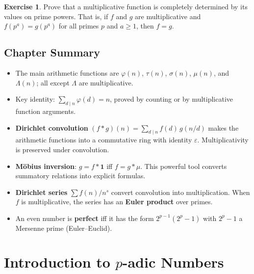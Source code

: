 \documentclass[12pt,a4paper,openany]{book}
\theoremstyle{definition}
\newtheorem{exercise}{Exercise}[chapter]
\theoremstyle{plain}
\theoremstyle{remark}
\begin{document}
\begin{exercise}\label{exer:multiplicative-determined}
Prove that a multiplicative function is completely determined by its values
on prime powers.  That is, if $f$ and $g$ are multiplicative and
$f(p^a) = g(p^a)$ for all primes $p$ and $a \ge 1$, then $f = g$.
\end{exercise}

\section*{Chapter Summary}

\begin{itemize}
  \item The main arithmetic functions are $\varphi(n)$, $\tau(n)$, $\sigma(n)$,
        $\mu(n)$, and $\Lambda(n)$; all except $\Lambda$ are multiplicative.
  \item Key identity: $\sum_{d\mid n}\varphi(d) = n$, proved by counting or
        by multiplicative function arguments.
  \item \textbf{Dirichlet convolution} $(f\ast g)(n) = \sum_{d\mid n}f(d)\,g(n/d)$
        makes the arithmetic functions into a commutative ring with identity
        $\varepsilon$.  Multiplicativity is preserved under convolution.
  \item \textbf{M\"obius inversion}: $g = f\ast\mathbf{1}$ iff
        $f = g\ast\mu$.  This powerful tool converts summatory relations
        into explicit formulas.
  \item \textbf{Dirichlet series} $\sum f(n)/n^s$ convert convolution into
        multiplication.  When $f$ is multiplicative, the series has an
        \textbf{Euler product} over primes.
  \item An even number is \textbf{perfect} iff it has the form
        $2^{p-1}(2^p-1)$ with $2^p-1$ a Mersenne prime (Euler--Euclid).
\end{itemize}


\chapter{Introduction to \texorpdfstring{$p$}{p}-adic Numbers}
\label{ch:p-adic}
\end{document}
